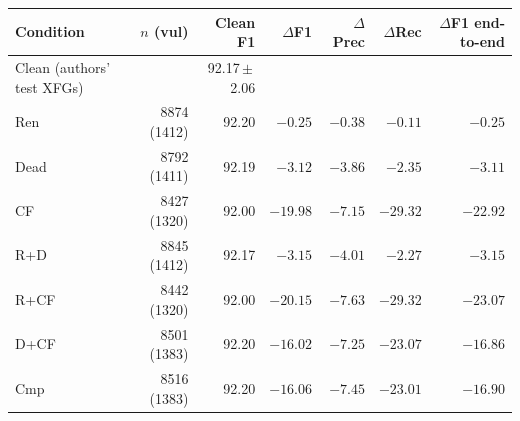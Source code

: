 \begin{tabular}{lrrrrrr}
\toprule
Condition & $n$ (vul) & Clean F1 & $\Delta$F1 & $\Delta$Prec & $\Delta$Rec & $\Delta$F1 end-to-end \\
\midrule
Clean (authors' test XFGs) & & 92.17\,$\pm$\,2.06 & & & & \\
Ren & 8874 (1412) & 92.20 & $\mathbf{-0.25}$ & $-0.38$ & $-0.11$ & $\mathbf{-0.25}$ \\
Dead & 8792 (1411) & 92.19 & $\mathbf{-3.12}$ & $-3.86$ & $-2.35$ & $\mathbf{-3.11}$ \\
CF & 8427 (1320) & 92.00 & $\mathbf{-19.98}$ & $-7.15$ & $-29.32$ & $\mathbf{-22.92}$ \\
R+D & 8845 (1412) & 92.17 & $\mathbf{-3.15}$ & $-4.01$ & $-2.27$ & $\mathbf{-3.15}$ \\
R+CF & 8442 (1320) & 92.00 & $\mathbf{-20.15}$ & $-7.63$ & $-29.32$ & $\mathbf{-23.07}$ \\
D+CF & 8501 (1383) & 92.20 & $\mathbf{-16.02}$ & $-7.25$ & $-23.07$ & $\mathbf{-16.86}$ \\
Cmp & 8516 (1383) & 92.20 & $\mathbf{-16.06}$ & $-7.45$ & $-23.01$ & $\mathbf{-16.90}$ \\
\bottomrule
\end{tabular}
